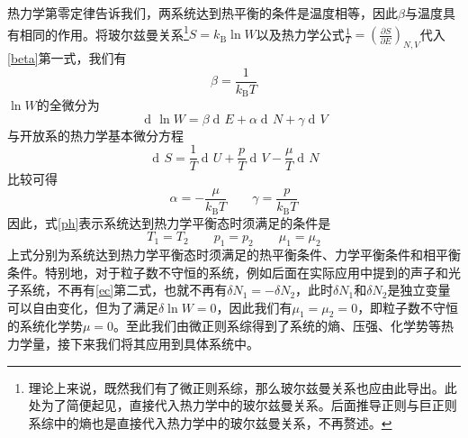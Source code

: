 \documentclass[UTF8,oneside,openany]{ctexbook}
\DeclareMathOperator\dif{d\!}
\newcommand\kb{k_{\text{B}}}
\begin{document}
热力学第零定律告诉我们，两系统达到热平衡的条件是温度相等，因此$\beta$与温度具有相同的作用。将玻尔兹曼关系\footnote{理论上来说，既然我们有了微正则系综，那么玻尔兹曼关系也应由此导出。此处为了简便起见，直接代入热力学中的玻尔兹曼关系。后面推导正则与巨正则系综中的熵也是直接代入热力学中的玻尔兹曼关系，不再赘述。}$S=\kb\ln W$以及热力学公式$\frac{1}{T}=(\frac{\partial S}{\partial E})_{N,V}$代入\ref{beta}第一式，我们有
\begin{equation}
\beta=\frac{1}{\kb T}
\end{equation}
$\ln W$的全微分为
\begin{equation}
\dif\ln W=\beta\dif E+\alpha\dif N+\gamma\dif V
\end{equation}
与开放系的热力学基本微分方程
\begin{equation}
\dif S=\frac1T\dif U+\frac{p}{T}\dif V-\frac{\mu}{T}\dif N
\end{equation}
比较可得
\begin{equation}\label{mup}
\alpha=-\frac{\mu}{\kb T}\qquad\gamma=\frac{p}{\kb T}
\end{equation}
因此，式\ref{ph}表示系统达到热力学平衡态时须满足的条件是
\begin{equation}
T_1=T_2\qquad p_1=p_2\qquad\mu_1=\mu_2
\end{equation}
上式分别为系统达到热力学平衡态时须满足的热平衡条件、力学平衡条件和相平衡条件。特别地，对于粒子数不守恒的系统，例如后面在实际应用中提到的声子和光子系统，不再有\ref{ec}第二式，也就不再有$\delta N_1=-\delta N_2$，此时$\delta N_1$和$\delta N_2$是独立变量可以自由变化，但为了满足$\delta\ln W=0$，因此我们有$\mu_1=\mu_2=0$，即粒子数不守恒的系统化学势$\mu=0$。至此我们由微正则系综得到了系统的熵、压强、化学势等热力学量，接下来我们将其应用到具体系统中。
\end{document}
